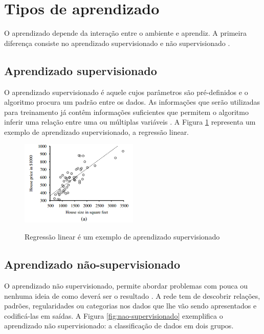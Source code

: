 \section{Tipos de aprendizado}

O aprendizado depende da interação entre o ambiente e aprendiz. A primeira diferença consiste no aprendizado supervisionado e não supervisionado \cite{uml}.

\subsection{Aprendizado supervisionado}

O aprendizado supervisionado é aquele cujos parâmetros são pré-definidos e o algoritmo procura um padrão entre os dados. As informações que serão utilizadas para treinamento já contêm informações suficientes que permitem o algoritmo inferir uma relação entre uma ou múltiplas variáveis \cite{learning-algorithms}. A Figura \ref{fig:reg-linear} representa um exemplo de aprendizado supervisionado, a regressão linear.

\begin{figure}[h]
    \caption{Regressão linear é um exemplo de aprendizado supervisionado}
    \centering
    \includegraphics[width=0.5\textwidth]{Textuais/Figuras/linear-ml.png}
    \label{fig:reg-linear}
\end{figure}

\subsection{Aprendizado não-supervisionado}

O aprendizado não supervisionado, permite abordar problemas com pouca ou nenhuma ideia de como deverá ser o resultado \cite{ai}. A rede tem de descobrir relações, padrões, regularidades ou categorias nos dados que lhe vão sendo apresentados e codificá-las em saídas. A Figura \ref{fig:nao-supervisionado} exemplifica o aprendizado não supervisionado: a classificação de dados em dois grupos.

